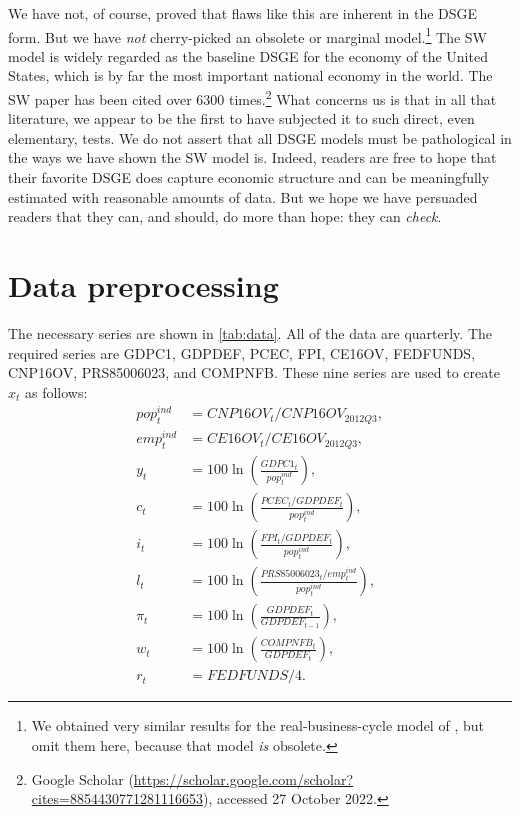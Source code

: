 \documentclass[11pt]{article}
\begin{document}
We have not, of course, proved that flaws like this are inherent in the
DSGE form. But we have \emph{not} cherry-picked an obsolete or marginal
model.\footnote{We obtained very similar results for the real-business-cycle
model of \citet{KydlandPrescott1982}, but omit them here, because that model
\emph{is} obsolete.} The SW model is widely regarded as the baseline
DSGE for the economy of the United States, which is by far the most
important national economy in the world. The SW paper has been cited
over 6300 times.\footnote{Google Scholar
(\url{https://scholar.google.com/scholar?cites=8854430771281116653}), accessed
27 October 2022.} What concerns us is that in all that literature, we
appear to be the first to have subjected it to such direct, even
elementary, tests. We do not assert that all DSGE models must be
pathological in the ways we have shown the SW model is. Indeed, readers
are free to hope that their favorite DSGE does capture economic
structure and can be meaningfully estimated with reasonable amounts of
data. But we hope we have persuaded readers that they can, and should,
do more than hope: they can \emph{check}.

\clearpage

\appendix

\hypertarget{sec:data-preprocessing}{%
\section{Data preprocessing}\label{sec:data-preprocessing}}

\footnotesize

The necessary series are shown in \autoref{tab:data}. All of the data
are quarterly. The required series are GDPC1, GDPDEF, PCEC, FPI, CE16OV,
FEDFUNDS, CNP16OV, PRS85006023, and COMPNFB. These nine series are used
to create \(x_t\) as follows: \begin{align*}
  pop_t^{ind} &= CNP16OV_t / CNP16OV_{2012Q3},\\
  emp_t^{ind} &= CE16OV_t / CE16OV_{2012Q3},\\
  y_t &= 100\ln\left(\frac{GDPC1_t}{pop_t^{ind}}\right),\\
  c_t &= 100\ln\left(\frac{PCEC_t/GDPDEF_t}{pop_t^{ind}}\right),\\
  i_t &= 100\ln\left(\frac{FPI_t/GDPDEF_t}{pop_t^{ind}}\right),\\
  l_t &=
        100\ln\left(\frac{PRS85006023_t/emp_t^{ind}}{pop_t^{ind}}\right),\\
  \pi_t &= 100\ln\left(\frac{GDPDEF_t}{GDPDEF_{t-1}}\right),\\
  w_t &= 100\ln\left(\frac{COMPNFB_t}{GDPDEF_t}\right),\\
  r_t &= FEDFUNDS/4.
\end{align*}
\end{document}
